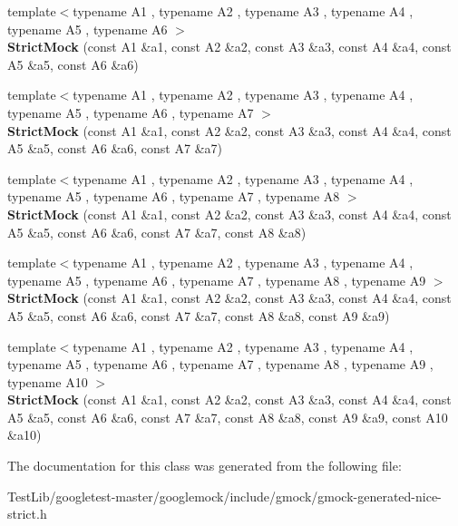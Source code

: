 \begin{DoxyCompactItemize}
\item 
\mbox{\label{classtesting_1_1StrictMock_a17b452e1e2f57d7d10f7209587376eef}} 
{\footnotesize template$<$typename A1 , typename A2 , typename A3 , typename A4 , typename A5 , typename A6 $>$ }\\{\bfseries Strict\+Mock} (const A1 \&a1, const A2 \&a2, const A3 \&a3, const A4 \&a4, const A5 \&a5, const A6 \&a6)
\item 
\mbox{\label{classtesting_1_1StrictMock_a4af48752fc22815250369292b9c064bc}} 
{\footnotesize template$<$typename A1 , typename A2 , typename A3 , typename A4 , typename A5 , typename A6 , typename A7 $>$ }\\{\bfseries Strict\+Mock} (const A1 \&a1, const A2 \&a2, const A3 \&a3, const A4 \&a4, const A5 \&a5, const A6 \&a6, const A7 \&a7)
\item 
\mbox{\label{classtesting_1_1StrictMock_aac6eaaad3e94491ada7bb43ee6149775}} 
{\footnotesize template$<$typename A1 , typename A2 , typename A3 , typename A4 , typename A5 , typename A6 , typename A7 , typename A8 $>$ }\\{\bfseries Strict\+Mock} (const A1 \&a1, const A2 \&a2, const A3 \&a3, const A4 \&a4, const A5 \&a5, const A6 \&a6, const A7 \&a7, const A8 \&a8)
\item 
\mbox{\label{classtesting_1_1StrictMock_a4129f247ae087d586fdb04f450422d3e}} 
{\footnotesize template$<$typename A1 , typename A2 , typename A3 , typename A4 , typename A5 , typename A6 , typename A7 , typename A8 , typename A9 $>$ }\\{\bfseries Strict\+Mock} (const A1 \&a1, const A2 \&a2, const A3 \&a3, const A4 \&a4, const A5 \&a5, const A6 \&a6, const A7 \&a7, const A8 \&a8, const A9 \&a9)
\item 
\mbox{\label{classtesting_1_1StrictMock_a4936b0a5622b39e974deae12ecb1430b}} 
{\footnotesize template$<$typename A1 , typename A2 , typename A3 , typename A4 , typename A5 , typename A6 , typename A7 , typename A8 , typename A9 , typename A10 $>$ }\\{\bfseries Strict\+Mock} (const A1 \&a1, const A2 \&a2, const A3 \&a3, const A4 \&a4, const A5 \&a5, const A6 \&a6, const A7 \&a7, const A8 \&a8, const A9 \&a9, const A10 \&a10)
\end{DoxyCompactItemize}


The documentation for this class was generated from the following file\+:\begin{DoxyCompactItemize}
\item 
Test\+Lib/googletest-\/master/googlemock/include/gmock/gmock-\/generated-\/nice-\/strict.\+h\end{DoxyCompactItemize}
